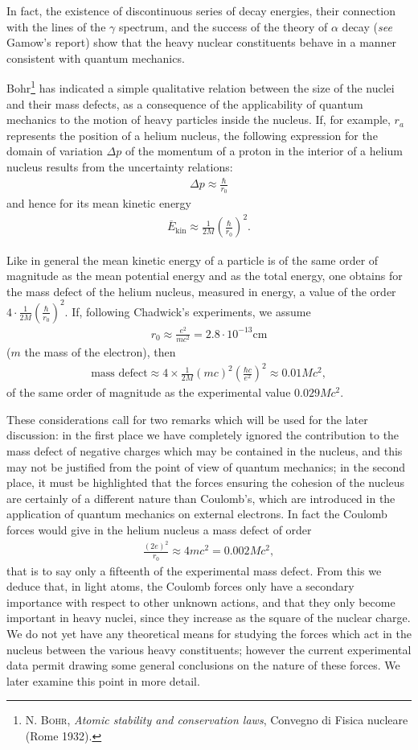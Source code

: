 \documentclass[a4paper,11pt]{article}
\newcommand{\?}[2]{#1\footnote{\textsc{Translator note}: #2}}
\newcommand{\nequ}[2]{\begin{align*}\tag{#1}#2\end{align*}}
\newcommand{\uequ}[1]{\begin{align*}#1\end{align*}}
\newcommand{\unit}[1]{\text{#1}}
\newcommand{\citeauthor}[1]{\textsc{#1}}
\newcommand{\citetitle}[1]{\textit{#1}}
\newcommand{\citepub}[1]{#1}
\begin{document}
In fact, the existence of discontinuous series of decay energies, their connection with the lines of the $\gamma$ spectrum, and the success of the theory of $\alpha$ decay (\textit{see} Gamow's report) show that the heavy nuclear constituents behave in a manner consistent with quantum mechanics.

Bohr\footnote{\citeauthor{N. Bohr}, \citetitle{Atomic stability and conservation laws}, \citepub{Convegno di Fisica nucleare} (Rome 1932).} has indicated a simple qualitative relation between the size of the nuclei and their mass defects, as a consequence of the applicability of quantum mechanics to the motion of heavy particles inside the nucleus. If, for example, $r_a$ represents the position of a helium nucleus, the following expression for the domain of variation $\Delta p$ of the momentum of a proton in the interior of a helium nucleus results from the uncertainty relations:
\nequ{1}{
\Delta p \approx \frac{\hbar}{r_0}
}
and hence for its mean kinetic energy
\nequ{2}{
\overline{E}_\text{kin} \approx \frac{1}{2M}\left(\frac{\hbar}{r_0}\right)^2.
}

Like in general the mean kinetic energy of a particle is of the same order of magnitude as the mean potential energy and as the total energy, one obtains for the mass defect of the helium nucleus, measured in energy, a value of the order $4\cdot\frac{1}{2M}\left(\frac{\hbar}{r_0}\right)^2$. If, following Chadwick's experiments, we assume
\uequ{
r_0 \approx \frac{e^2}{mc^2} = 2.8\cdot 10^{-13}\unit{cm}
}
($m$ the mass of the electron), then
\uequ{
\text{mass defect} \approx 4\times\frac{1}{2M}(mc)^2\left(\frac{\hbar c}{e^2}\right)^2 \approx 0.01 Mc^2,
}
of the same order of magnitude as the experimental value $0.029Mc^2$.

These considerations call for two remarks which will be used for the later discussion: in the first place we have completely ignored the contribution to the mass defect of negative charges which may be contained in the nucleus, and this may not be justified from the point of view of quantum mechanics; in the second place, it must be highlighted that the forces ensuring the cohesion of the nucleus are certainly of a different nature than Coulomb's, which are introduced in the application of quantum mechanics on external electrons. In fact the Coulomb forces would give in the helium nucleus a mass defect of order
\uequ{
\frac{(2e)^2}{r_0}\approx 4mc^2 = 0.002Mc^2,
}
that is to say only a fifteenth of the experimental mass defect. From this we deduce that, in light atoms, the Coulomb forces only have a secondary importance with respect to other unknown actions, and that they only become important in heavy nuclei, since they increase as the square of the nuclear charge. We do not yet have any theoretical means for studying the forces which act in the nucleus between the various heavy constituents; however the current experimental data permit drawing some general conclusions on the nature of these forces. We later examine this point in more detail.
\end{document}
